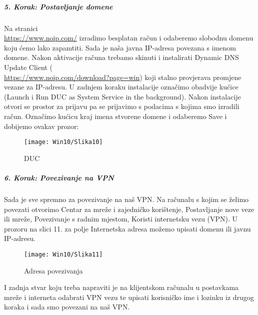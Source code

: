 \FloatBarrier
\subparagraph{5. Korak: Postavljanje domene}
\hfill \smallbreak
Na stranici \\ \url{https://www.noip.com/} izradimo besplatan račun i odaberemo slobodnu domenu koju ćemo lako zapamtiti. Sada je naša javna IP-adresa povezana s imenom domene. Nakon aktivacije računa trebamo skinuti i instalirati Dynamic DNS Update Client (\\ \url{https://www.noip.com/download?page=win}) koji stalno provjerava promjene vezane za IP-adresu. U zadnjem koraku instalacije označimo obadvije kućice (Launch i Run DUC as System Service in the background). Nakon instalacije otvori se prostor za prijavu pa se prijavimo s podacima s kojima smo izradili račun. Označimo kućicu kraj imena stvorene domene i odaberemo Save  i dobijemo ovakav prozor: 
\FloatBarrier
\FloatBarrier
\begin{figure}[h!]
	\centering
     \texttt{[image: Win10/Slika10]}
     \caption{DUC}
\end{figure}
\FloatBarrier
\subparagraph{6. Korak: Povezivanje na VPN}
\hfill \smallbreak
Sada je sve spremno za povezivanje na naš VPN. Na računalu s kojim se želimo povezati otvorimo Centar za mreže i zajedničko korištenje, Postavljanje nove veze ili mreže, Povezivanje s radnim mjestom, Koristi internetsku vezu (VPN). U prozoru na slici 11. za polje Internetska adresa možemo upisati domenu ili javnu IP-adresu.
\FloatBarrier
\begin{figure}[h!]
	\centering
     \texttt{[image: Win10/Slika11]}
     \caption{Adresa povezivanja}
\end{figure}
\FloatBarrier
I zadnja stvar koju treba napraviti je na klijentskom računalu u postavkama mreže i interneta odabrati VPN vezu te upisati korisničko ime i lozinku iz drugog koraka i sada smo povezani na naš VPN.

\FloatBarrier